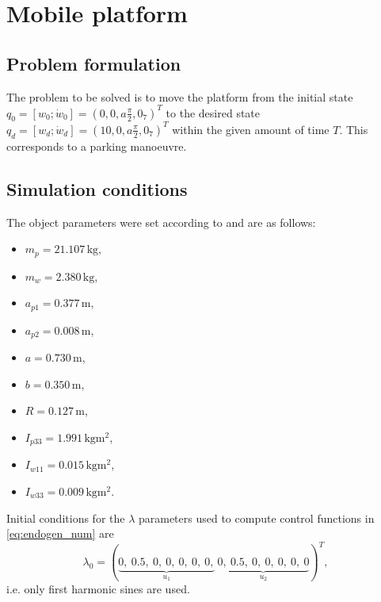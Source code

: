 

\section{Mobile platform}
\subsection{Problem formulation}
\label{sec:rex_task}
The problem to be solved is to move the platform from the initial state
$q_0 = [w_0; \dot{w}_0] = (0, 0, a\frac{\pi}{2}, 0_7)^T$ to the desired state
$q_d = [w_d; \dot{w}_d] = (10, 0, a\frac{\pi}{2}, 0_7)^T$
within the given amount of time $T$. 
This corresponds to a parking manoeuvre.
%

\subsection{Simulation conditions}
\label{sec:pltf_params}
The object parameters were set according to \cite{coupled} and are as follows:
\begin{multicols}{2}
\begin{itemize}
\item $m_p = 21.107\,\mathrm{kg}$,
\item $m_w = 2.380\,\mathrm{kg}$,
\item $a_{p1} = 0.377\,\mathrm{m}$,
\item $a_{p2} = 0.008\,\mathrm{m}$,
\item $a = 0.730\,\mathrm{m}$,
\item $b = 0.350\,\mathrm{m}$,
\item $R = 0.127\,\mathrm{m}$,
\item $I_{p33} = 1.991\,\mathrm{kgm^2}$,
\item $I_{w11} = 0.015\,\mathrm{kgm^2}$,
\item $I_{w33} = 0.009\,\mathrm{kgm^2}$.
\end{itemize}
\end{multicols}
\setcounter{MaxMatrixCols}{14}
Initial conditions for the $\lambda$ parameters used to compute control functions
in \eqref{eq:endogen_num} are
\begin{equation}
\lambda_0=
(\underbrace{0, \ 0.5, \ 0, \ 0, \ 0, \ 0, \ 0,}_{u_1}\ \underbrace{0, \ 0.5, \ 0, \ 0, \ 0, \ 0, \ 0}_{u_2})^T,
\end{equation}
i.e. only first harmonic sines are used.
 	

